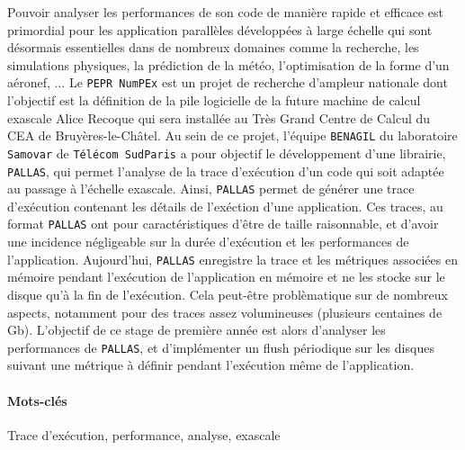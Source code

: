 

Pouvoir analyser les performances de son code de manière rapide et efficace est primordial pour les application parallèles développées à large échelle qui sont désormais essentielles dans de nombreux domaines comme la recherche, les simulations physiques, la prédiction de la météo, l'optimisation de la forme d'un aéronef, ... \newline
Le \verb!PEPR NumPEx! est un projet de recherche d'ampleur nationale dont l'objectif est la définition de la pile logicielle de la future machine de calcul exascale Alice Recoque qui sera installée au Très Grand Centre de Calcul du CEA de Bruyères-le-Châtel. Au sein de ce projet, l'équipe \verb!BENAGIL! du laboratoire \verb!Samovar! de \verb!Télécom SudParis! 
a pour objectif le développement d'une librairie, \verb!PALLAS!, qui permet l'analyse de la trace d'exécution d'un code qui soit adaptée au passage à l'échelle exascale. Ainsi, \verb!PALLAS! permet de générer une trace d'exécution contenant les détails de l'exéction d'une application. Ces traces, au format \verb!PALLAS! ont pour caractéristiques d'être de taille raisonnable, 
et d'avoir une incidence négligeable sur la durée d'exécution et les performances de l'application.\newline
Aujourd'hui, \verb!PALLAS! enregistre la trace et les métriques associées en mémoire pendant l'exécution de l'application en mémoire et ne les stocke sur le disque qu'à la fin de l'exécution. Cela peut-être problèmatique sur de nombreux aspects, notamment pour des traces assez volumineuses (plusieurs centaines de Gb).
L'objectif de ce stage de première année est alors d'analyser les performances de \verb!PALLAS!, et d'implémenter un flush périodique sur les disques suivant une métrique à définir pendant l'exécution même de l'application.



\paragraph*{Mots-clés}\label{par:mots-cles}


Trace d'exécution, performance, analyse, exascale
